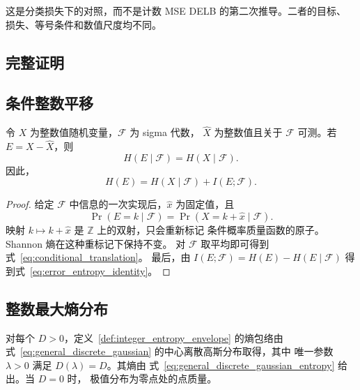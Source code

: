 这是分类损失下的对照，而不是计数 MSE DELB 的第二次推导。二者的目标、
损失、等号条件和数值尺度均不同。

\subsection{完整证明}

\subsection{条件整数平移}

\begin{Lemma}[可测整数平移下的熵不变性]
\label{lem:conditional_translation}
令 \(X\) 为整数值随机变量，\(\mathcal F\) 为 sigma 代数，
\(\widehat X\) 为整数值且关于 \(\mathcal F\) 可测。若
\(E=X-\widehat X\)，则
\begin{equation}
H(E\mid\mathcal{F})=H(X\mid\mathcal{F}).
\label{eq:conditional_translation}
\end{equation}
因此，
\begin{equation}
H(E)
=
H(X\mid\mathcal{F})+I(E;\mathcal{F}).
\label{eq:error_entropy_identity}
\end{equation}
\end{Lemma}

\begin{proof}
给定 \(\mathcal F\) 中信息的一次实现后，\(\widehat x\) 为固定值，且
\[
\Pr(E=k\mid\mathcal{F})
=
\Pr(X=k+\widehat{x}\mid\mathcal{F}).
\]
映射 \(k\mapsto k+\widehat x\) 是 \(\mathbb Z\) 上的双射，只会重新标记
条件概率质量函数的原子。Shannon 熵在这种重标记下保持不变。
对 \(\mathcal F\) 取平均即可得到式~\eqref{eq:conditional_translation}。
最后，由
\(I(E;\mathcal{F})=H(E)-H(E\mid\mathcal{F})\)
得到式~\eqref{eq:error_entropy_identity}。
\end{proof}

\subsection{整数最大熵分布}

\begin{Lemma}[离散高斯极值分布]
\label{lem:discrete_gaussian_extremizer}
对每个 \(D>0\)，定义~\ref{def:integer_entropy_envelope} 的熵包络由
式~\eqref{eq:general_discrete_gaussian} 的中心离散高斯分布取得，其中
唯一参数 \(\lambda>0\) 满足 \(D(\lambda)=D\)。其熵由
式~\eqref{eq:general_discrete_gaussian_entropy} 给出。当 \(D=0\) 时，
极值分布为零点处的点质量。
\end{Lemma}

